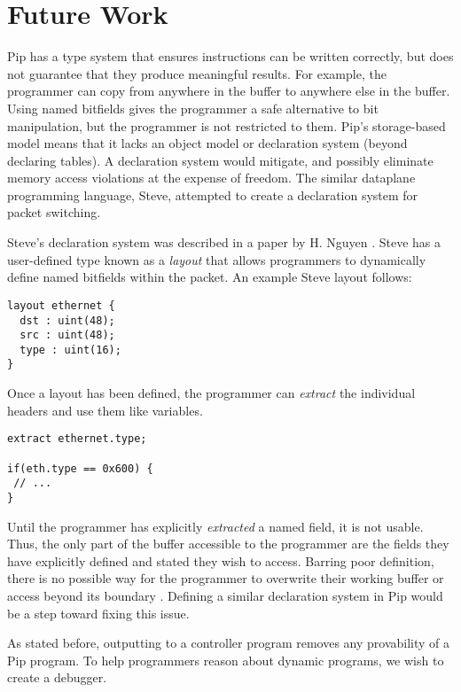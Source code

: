 
\section{Future Work}
Pip has a type system that ensures instructions can be written correctly, but does not guarantee that they produce meaningful results. For example, the programmer can copy from anywhere in the buffer to anywhere else in the buffer. Using named bitfields gives the programmer a safe alternative to bit manipulation, but the programmer is not restricted to them. Pip's storage-based model means that it lacks an object model or declaration system (beyond declaring tables). A declaration system would mitigate, and possibly eliminate memory access violations at the expense of freedom. The similar dataplane programming language, Steve, attempted to create a declaration system for packet switching.

Steve's declaration system was described in a paper by H. Nguyen \cite{Nguyen2016}. Steve has a user-defined type known as a \textit{layout} that allows programmers to dynamically define named bitfields within the packet. An example Steve layout follows:
\begin{mdframed}
\begin{verbatim}
layout ethernet {
  dst : uint(48);
  src : uint(48);
  type : uint(16);
}
\end{verbatim}
\end{mdframed}
Once a layout has been defined, the programmer can \textit{extract} the individual headers and use them like variables.
\begin{mdframed}
\begin{verbatim}
extract ethernet.type;

if(eth.type == 0x600) {
 // ...
}
\end{verbatim}
\end{mdframed}
Until the programmer has explicitly \textit{extracted} a named field, it is not usable. Thus, the only part of the buffer accessible to the programmer are the fields they have explicitly defined and stated they wish to access. Barring poor definition, there is no possible way for the programmer to overwrite their working buffer or access beyond its boundary \cite{Nguyen2016}. Defining a similar declaration system in Pip would be a step toward fixing this issue.

As stated before, outputting to a controller program removes any provability of a Pip program. To help programmers reason about dynamic programs, we wish to create a debugger.


